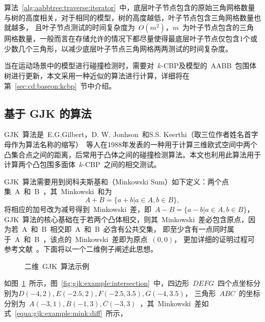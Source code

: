 算法~\ref{alg:aabbtree:traverse:iterator}~中，底层叶子节点包含的原始三角网格数量与树的高度相关，对于相同的模型，树的高度越低，叶子节点包含三角网格数量也就越多，
且叶子节点测试的时间复杂度为~$O(m^2)$，$m$~为叶子节点包含的三角网格数量，一般而言在存储允许的情况下都尽量使得最底层叶子节点仅包含1个或少数几个三角形，以减少底层叶子节点三角网格两两测试的时间复杂度。

当在运动场景中的模型进行碰撞检测时，需要对~$k$-CBP及模型的~AABB~包围体树进行更新，本文采用一种近似的算法进行计算，详细将在第~\ref{sec:cd:baseon:kcbp}~节中介绍。

\subsection{基于 GJK 的算法}
\label{subsec:kcbp:cd:gjk}

GJK~算法是~E.G.Gilbert，D. W. Jonhson~和S.S. Keerthi（取三位作者姓名首字母作为算法名称的缩写）~等人在1988年发表的一种用于计算三维欧式空间中两个凸集合点之间的距离\cite{gilbert1988fast}，后常用于凸体之间的碰撞检测算法\cite{bergen1999fast}。本文也利用此算法用于计算两个凸包围多面体~$k$-CBP~之间的相交测试。

GJK~算法需要用到闵科夫斯基和（Minkowski Sum）如下定义：两个点集~A~和~B~，其~Minkowski~和为
\begin{equation}
  A + B = \{ a + b | a \in A, b \in B\},  
  \label{}
\end{equation}
将相应的加号改为减号得到~Minkowski~差，即~$A - B = \{ a - b | a \in A, b \in B\}$，GJK~算法的核心基础在于若两个凸体相交，则其~Minkowski~差必包含原点，因为若~A~和~B~相交即~A~和~B~必含有公共交集，
即至少含有一点同时属于~A~和~B~，该点的~Minkowski~差即为原点~$(0, 0)$，
更加详细的证明过程可参考文献~。下面将以一个二维例子阐述此思想。

\begin{figure}[htbp]
\centering
{} 
\caption{二维~GJK~算法示例}
\label{fig:gjk:example:2d}
\end{figure}

如图~\ref{fig:gjk:example:2d}~所示，图~\ref{fig:gjk:example:intersection}~中，四边形~$DEFG$~四个点坐标分别为$D(-4, 2), E(-2.5, 2), F(-2.5, 3.5), G(-4, 3.5)$，
三角形~$ABC$~的坐标分别为~$A(-3, 1), B(-1,3), C(-3, 3)$~，其~Minkowski~差如式~\ref{equa:gjk:example:mink:diff}~所示，

